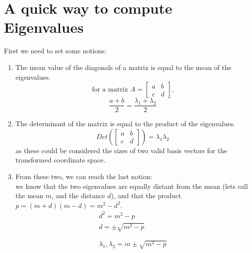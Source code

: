 \documentclass{article}
\begin{document}
\section{A quick way to compute Eigenvalues}
First we need to set some notions:\\
\begin{enumerate}
    \item The mean value of the diagonals of a matrix is equal to the mean of the eigenvalues.
    \[\text{for a matrix }A = \begin{bmatrix}
        a&b\\
        c&d
    \end{bmatrix}\text{,}
    \]
    \[
    \frac{a+b}{2} = \frac{\lambda_{1}+\lambda_{2}}{2}
    \]
    \item The determinant of the matrix is equal to the product of the eigenvalues.
    \[Det\left(\begin{bmatrix}
        a&b\\
        c&d
    \end{bmatrix}\right) = \lambda_{1}\lambda_{2}
    \]
    as these could be considered the sizes of two valid basis vectors for the transformed coordinate space.
    \item From these two, we can reach the last notion:\\
    we know that the two eigenvalues are equally distant from the mean (lets call the mean $m$, and the distance $d$), and that the product $p=(m+d)(m-d)=m^{2}-d^{2}$.
    \begin{align*}
        d^{2}=m^{2}-p\\
        d=\pm\sqrt{m^{2}-p}\\\\\\
        \lambda_{1},\lambda_{2}=m\pm\sqrt{m^{2}-p}
    \end{align*}
\end{enumerate}
\end{document}
